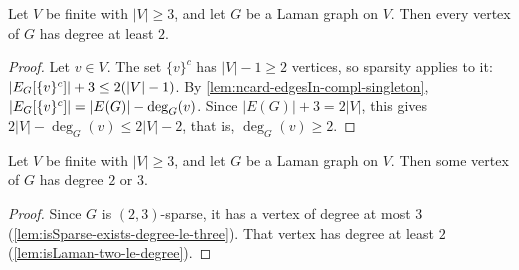\begin{lemma}
  \label{lem:isLaman-two-le-degree}
  \leanok
  Let $V$ be finite with $|V| \ge 3$, and let $G$ be a Laman graph on
  $V$. Then every vertex of $G$ has degree at least $2$.
\end{lemma}
\begin{proof}
  \leanok
  Let $v \in V$. The set $\{v\}^c$ has $|V| - 1 \ge 2$ vertices, so
  sparsity applies to it:
  $|E_{G}[\{v\}^c]| + 3 \le 2(|V| - 1)$. By
  \cref{lem:ncard-edgesIn-compl-singleton},
  $|E_{G}[\{v\}^c]| = |E(G)| - \deg_G(v)$. Since
  $|E(G)| + 3 = 2|V|$, this gives $2|V| - \deg_G(v) \le 2|V| - 2$, that
  is, $\deg_G(v) \ge 2$.
\end{proof}

\begin{lemma}
  \label{lem:isLaman-exists-two-le-degree-le-three}
  \leanok
  Let $V$ be finite with $|V| \ge 3$, and let $G$ be a Laman graph on
  $V$. Then some vertex of $G$ has degree $2$ or $3$.
\end{lemma}
\begin{proof}
  \leanok
  Since $G$ is $(2,3)$-sparse, it has a vertex of degree at most $3$
  (\cref{lem:isSparse-exists-degree-le-three}). That vertex has degree
  at least $2$ (\cref{lem:isLaman-two-le-degree}).
\end{proof}

